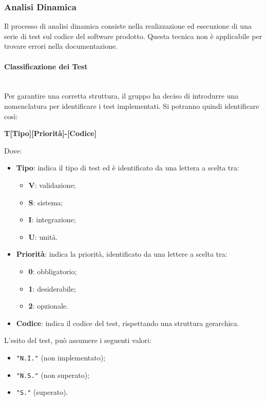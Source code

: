 \subsubsection{Analisi Dinamica}
Il processo di analisi dinamica consiste nella realizzazione ed esecuzione di una serie di test sul codice del software prodotto. Questa tecnica non è applicabile per trovare errori nella documentazione.

\paragraph{Classificazione dei Test}\label{Class_test} \-\\
Per garantire una corretta struttura, il gruppo ha deciso di introdurre una nomenclatura per identificare i test implementati. Si potranno quindi identificare così:

\begin{center}
	\textbf{T[Tipo][Priorità]-[Codice]}
\end{center}
Dove:
\begin{itemize}
	\item \textbf{Tipo}: indica il tipo di test ed è identificato da una lettera a scelta tra:

	\begin{itemize}
		\item \textbf{V}: validazione;
		\item \textbf{S}: sistema;
		\item \textbf{I}: integrazione;
		\item \textbf{U}: unità.
	\end{itemize}

	\item \textbf{Priorità}: indica la priorità, identificato da una lettere a scelta tra:
	\begin{itemize}
		\item \textbf{0}: obbligatorio;
		\item \textbf{1}: desiderabile;
		\item \textbf{2}: opzionale.
	\end{itemize}
	\item \textbf{Codice}: indica il codice del test, rispettando una struttura gerarchica.
\end{itemize}

L'esito del test, può assumere i seguenti valori:
\begin{itemize}
	\item \texttt{"N.I."} (non implementato);
	\item \texttt{"N.S."} (non superato);
	\item \texttt{"S."} (superato).
\end{itemize}

